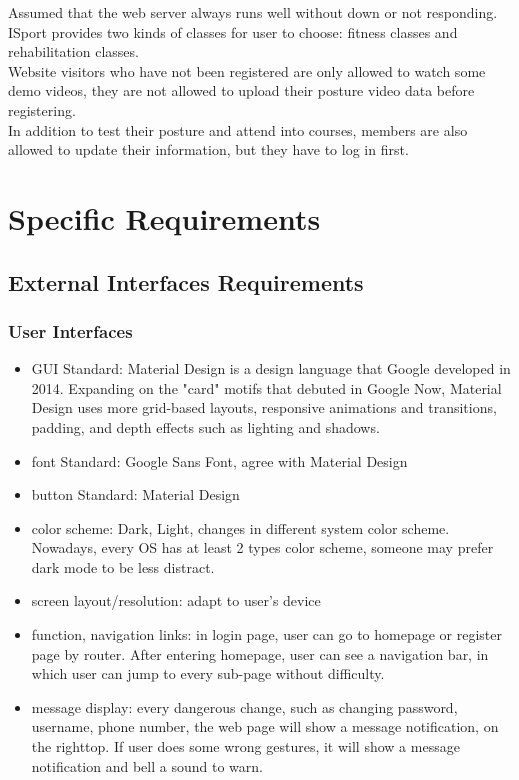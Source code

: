 \documentclass[16pt]{scrreprt}
\begin{document}
Assumed that the web server always runs well without down or not responding.\\


ISport provides two kinds of classes for user to choose: fitness classes and rehabilitation classes.\\

Website visitors who have not been registered are only allowed to watch some demo videos, they are not allowed to upload their posture video data before registering.\\

In addition to test their posture and attend into courses, members are also allowed to update their information, but they have to log in first.\\


\chapter{Specific Requirements}
\label{Specific Requirements}
\section{External Interfaces Requirements}
\subsection{User Interfaces}
\begin{itemize}
    \item GUI Standard: Material Design is a design language that Google developed in 2014. Expanding on the "card" motifs that debuted in Google Now, Material Design uses more grid-based layouts, responsive animations and transitions, padding, and depth effects such as lighting and shadows.
    \item font Standard: Google Sans Font, agree with Material Design
    \item button Standard: Material Design
    \item color scheme: Dark, Light, changes in different system color scheme. Nowadays, every OS has at least 2 types color scheme, someone may prefer dark mode to be less distract.
    \item screen layout/resolution: adapt to user's device
    \item function, navigation links: in login page, user can go to homepage or register page by router. After entering homepage, user can see a navigation bar, in which user can jump to every sub-page without difficulty.
    \item message display: every dangerous change, such as changing password, username, phone number, the web page will show a message notification, on the righttop. If user does some wrong gestures, it will show a message notification and bell a sound to warn.
\end{itemize}
\end{document}
